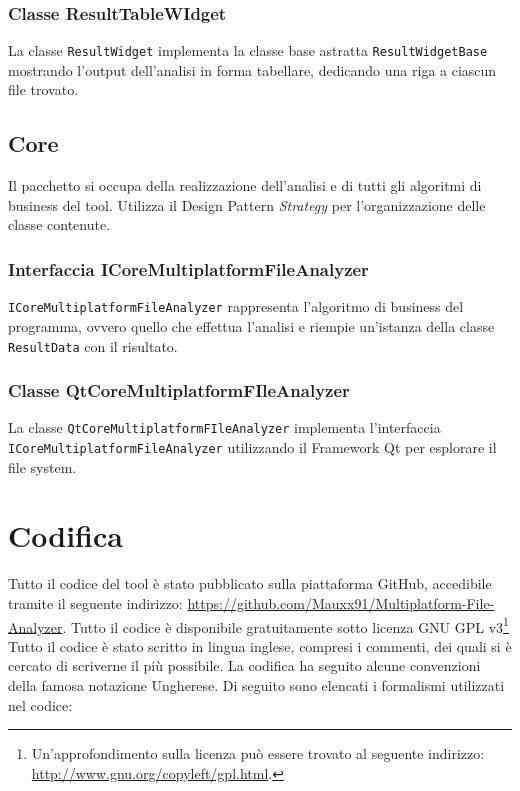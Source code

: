 \subsubsection{Classe ResultTableWIdget}
La classe \texttt{ResultWidget} implementa la classe base astratta \texttt{ResultWidgetBase} mostrando l'output dell'analisi in forma tabellare, dedicando una riga a ciascun file trovato.

\subsection{Core}
Il pacchetto si occupa della realizzazione dell'analisi e di tutti gli algoritmi di business del tool. Utilizza il Design Pattern \textit{Strategy} per l'organizzazione delle classe contenute.

\subsubsection{Interfaccia ICoreMultiplatformFileAnalyzer}
\texttt{ICoreMultiplatformFileAnalyzer} rappresenta l'algoritmo di business del programma, ovvero quello che effettua l'analisi e riempie un'istanza della classe \texttt{ResultData} con il risultato.

\subsubsection{Classe QtCoreMultiplatformFIleAnalyzer}
La classe \texttt{QtCoreMultiplatformFIleAnalyzer} implementa l'interfaccia\\ \texttt{ICoreMultiplatformFileAnalyzer} utilizzando il Framework Qt per esplorare il file system.

\section{Codifica}
Tutto il codice del tool è stato pubblicato sulla piattaforma GitHub, accedibile tramite il seguente indirizzo: \url{https://github.com/Mauxx91/Multiplatform-File-Analyzer}. Tutto il codice è disponibile gratuitamente sotto licenza GNU GPL v3\footnote{Un'approfondimento sulla licenza può essere trovato al seguente indirizzo: \url{http://www.gnu.org/copyleft/gpl.html}.}\\

Tutto il codice è stato scritto in lingua inglese, compresi i commenti, dei quali si è cercato di scriverne il più possibile.
La codifica ha seguito alcune convenzioni della famosa notazione Ungherese. Di seguito sono elencati i formalismi utilizzati nel codice:


